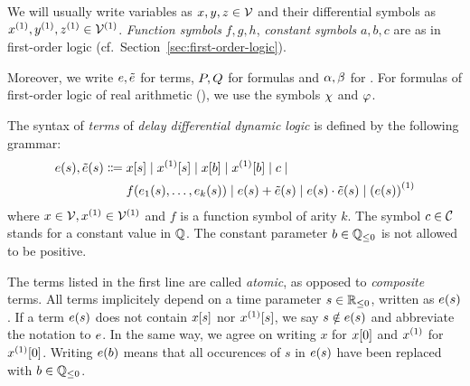     We will usually write variables as $x,y,z\in\mathcal{V}$ and their differential symbols as $\D{x},\D{y},\D{z}\in\diffvars$.
    \emph{Function symbols} $f,g,h$, \emph{constant symbols} $a,b,c$
    are as in first-order logic (cf.\ Section~\ref{sec:first-order-logic}).

    Moreover, we write $e,\tilde{e}$ for \ddL terms, $P,Q$ for \ddL formulas and $\alpha,\beta$ for \dHPs. For formulas of first-order logic of real arithmetic (\FOLR), we use the symbols $\chi$ and $\varphi$.

    \begin{definition}[s-Terms]\label{def:syntax-terms}
        The syntax of \emph{terms} of \emph{delay differential dynamic logic} is defined by the following grammar:
        \begin{align*}
            \astrm(s),\bstrm(s) \Coloneqq{}&
                \x[s] \mid
                \Dx[s] \mid
                \x[b] \mid
                \Dx[b] \mid
                c \mid\\
                & f(\range{\istrm{1}(s)}{\istrm{k}(s)}) \mid
                \astrm(s) + \bstrm(s) \mid
                \astrm(s) \cdot \bstrm(s) \mid
                \D{(\astrm(s))}
        \end{align*}
        where $x\in\allvars,\D{x}\in\diffvars$ and $f$ is a function symbol of arity $k$.
        The symbol $c\in\mathcal{C}_{}$ stands for a constant value in $\mathbb{Q}$. The constant parameter $b\in\mathbb{Q}_{\leq 0}$ is not allowed to be positive.
    \end{definition}

    The terms listed in the first line are called \emph{atomic}, as opposed to \emph{composite} terms.
    All terms implicitely depend on a time parameter $s\in\mathbb{R}_{\leq 0}$, written as $e(s)$.
    If a term $e(s)$ does not contain $x[s]$ nor $\Dx[s]$, we say $s\notin e(s)$ and abbreviate the notation to $e$.
    In the same way, we agree on writing $x$ for $x[0]$ and $\D{x}$ for $\Dx[0]$. Writing $e(b)$ means that all occurences of $s$ in $e(s)$ have been replaced with $b\in\mathbb{Q}_{\leq 0}$.

